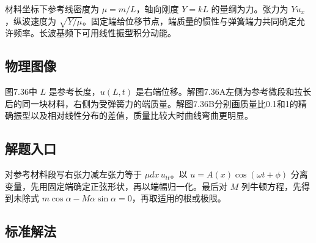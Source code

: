 \documentclass[UTF8,fontset=fandol,a4paper,11pt]{ctexart}
\begin{document}
材料坐标下参考线密度为 $\mu=m/L$，轴向刚度 $Y=kL$ 的量纲为力。张力为 $Yu_x$，纵波速度为 $\sqrt{Y/\mu}$。固定端给位移节点，端质量的惯性与弹簧端力共同确定允许频率。长波基频下可用线性振型积分动能。




\subsection*{物理图像}

图7.36中 $L$ 是参考长度，$u(L,t)$ 是右端位移。解图7.36A左侧为参考微段和拉长后的同一块材料，右侧为受弹簧力的端质量。解图7.36B分别画质量比0.1和1的精确振型以及相对线性分布的差值，质量比较大时曲线弯曲更明显。




\subsection*{解题入口}

对参考材料段写右张力减左张力等于 $\mu dx\,u_{tt}$。以 $u=A(x)\cos(\omega t+\phi)$ 分离变量，先用固定端确定正弦形状，再以端幅归一化。最后对 $M$ 列牛顿方程，先得到未除式 $m\cos\alpha-M\alpha\sin\alpha=0$，再取适用的根或极限。



\subsection*{标准解法}
\end{document}
